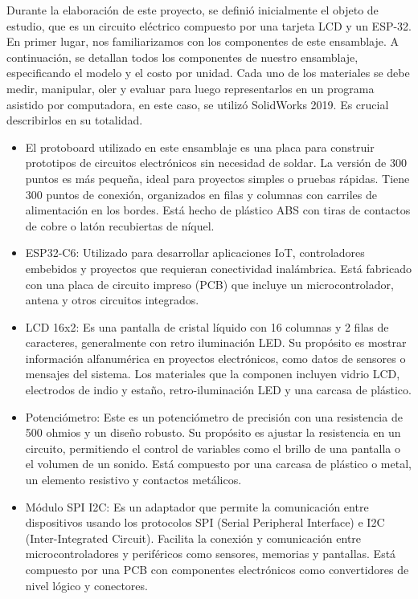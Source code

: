     Durante la elaboración de este proyecto, se definió inicialmente el objeto de estudio, que es un circuito eléctrico compuesto por una tarjeta LCD y un ESP-32. En primer lugar, nos familiarizamos con los componentes de este ensamblaje. A continuación, se detallan todos los componentes de nuestro ensamblaje, especificando el modelo y el costo por unidad. Cada uno de los materiales se debe medir, manipular, oler y evaluar para luego representarlos en un programa asistido por computadora, en este caso, se utilizó SolidWorks 2019. Es crucial describirlos en su totalidad.
    \begin{itemize}
    \item El protoboard utilizado en este ensamblaje es una placa para construir prototipos de circuitos electrónicos sin necesidad de soldar. La versión de 300 puntos es más pequeña, ideal para proyectos simples o pruebas rápidas. Tiene 300 puntos de conexión, organizados en filas y columnas con carriles de alimentación en los bordes. Está hecho de plástico ABS con tiras de contactos de cobre o latón recubiertas de níquel.
    \item ESP32-C6: Utilizado para desarrollar aplicaciones IoT, controladores embebidos y proyectos que requieran conectividad inalámbrica. Está fabricado con una placa de circuito impreso (PCB) que incluye un microcontrolador, antena y otros circuitos integrados.
    \item LCD 16x2: Es una pantalla de cristal líquido con 16 columnas y 2 filas de caracteres, generalmente con retro iluminación LED. Su propósito es mostrar información alfanumérica en proyectos electrónicos, como datos de sensores o mensajes del sistema. Los materiales que la componen incluyen vidrio LCD, electrodos de indio y estaño, retro-iluminación LED y una carcasa de plástico.
    
    \item Potenciómetro: Este es un potenciómetro de precisión con una resistencia de 500 ohmios y un diseño robusto. Su propósito es ajustar la resistencia en un circuito, permitiendo el control de variables como el brillo de una pantalla o el volumen de un sonido. Está compuesto por una carcasa de plástico o metal, un elemento resistivo y contactos metálicos.
    
    \item Módulo SPI I2C: Es un adaptador que permite la comunicación entre dispositivos usando los protocolos SPI (Serial Peripheral Interface) e I2C (Inter-Integrated Circuit). Facilita la conexión y comunicación entre microcontroladores y periféricos como sensores, memorias y pantallas. Está compuesto por una PCB con componentes electrónicos como convertidores de nivel lógico y conectores.
    

\end{itemize}
